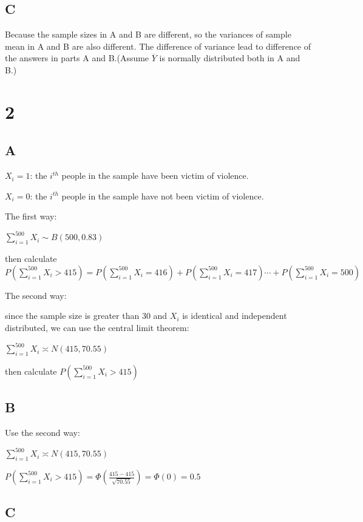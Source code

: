 \documentclass{article}
\begin{document}
	\subsection*{C}
	Because the sample sizes in A and B are different, so the variances of sample mean in A and B are also different. The difference of variance lead to difference of the answers in parts A and B.(Assume $\overline{Y}$ is normally distributed both in A and B.)
	
	\section*{2}
	
	\subsection*{A}\noindent
	
	$X_i=1$: the $i^{th}$ people in the sample have been victim of violence.
	
	$X_i=0$: the $i^{th}$ people in the sample have not been victim of violence.
	
	The first way:
	
	$\sum_{i=1}^{500} X_i\sim B(500,0.83)$
	
	then calculate $P(\sum_{i=1}^{500} X_i>415)=P(\sum_{i=1}^{500} X_i=416)+P(\sum_{i=1}^{500} X_i=417)\cdots+P(\sum_{i=1}^{500} X_i=500)$
	
	\hspace*{\fill}
		
	The second way:
	
	since the sample size is greater than 30 and $X_i$ is identical and independent distributed, we can use the central limit theorem:
	
	$\sum_{i=1}^{500} X_i\asymp N(415,70.55)$
	
	then calculate $P(\sum_{i=1}^{500} X_i>415)$
	
	\subsection*{B}
	
	Use the second way:
	
	$\sum_{i=1}^{500} X_i\asymp N(415,70.55)$
	
	$P(\sum_{i=1}^{500} X_i>415)=\Phi(\frac{415-415}{\sqrt{70.55}})=\Phi(0)=0.5$
	
	\subsection*{C}\noindent
	
\end{document}
